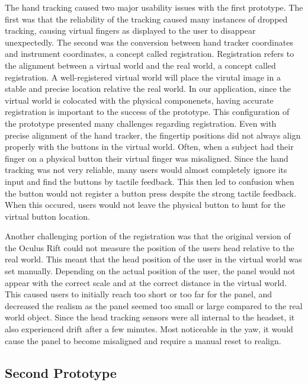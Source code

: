 The hand tracking caused two major usability issues with the first prototype.
The first was that the reliability of the tracking caused many instances of dropped tracking, causing virtual fingers as displayed to the user to disappear unexpectedly.
The second was the conversion between hand tracker coordinates and instrument coordinates, a concept called registration.
Registration refers to the alignment between a virtual world and the real world, a concept called registration.
A well-registered virtual world will place the virutal image in a stable and precise location relative the real world.
In our application, since the virtual world is colocated with the physical componenets, having accurate registration is important to the success of the prototype.
This configuration of the prototype presented many challenges regarding registration.
Even with precise alignment of the hand tracker, the fingertip positions did not always align properly with the buttons in the virtual world.
Often, when a subject had their finger on a physical button their virtual finger was misaligned.
Since the hand tracking was not very reliable, many users would almost completely ignore its input and find the buttons by tactile feedback.
This then led to confusion when the button would not register a button press despite the strong tactile feedback.
When this occured, users would not leave the physical button to hunt for the virtual button location.

Another challenging portion of the registration was that the original version of the Oculus Rift could not measure the position of the users head relative to the real world.
This meant that the head position of the user in the virtual world was set manually.
Depending on the actual position of the user, the panel would not appear with the correct scale and at the correct distance in the virtual world.
This caused users to initially reach too short or too far for the panel, and decreased the realism as the panel seemed too small or large compared to the real world object.
Since the head tracking sensors were all internal to the headset, it also experienced drift after a few minutes.
Most noticeable in the yaw, it would cause the panel to become misaligned and require a manual reset to realign.

\subsection{Second Prototype}

